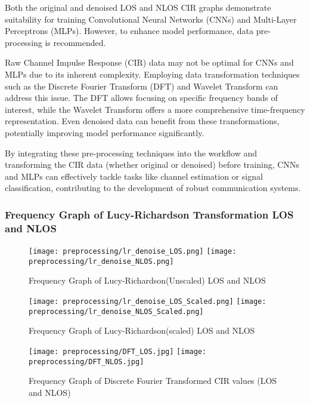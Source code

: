 Both the original and denoised LOS and NLOS CIR graphs demonstrate suitability for training Convolutional Neural Networks (CNNs) and Multi-Layer Perceptrons (MLPs). However, to enhance model performance, data pre-processing is recommended. 

Raw Channel Impulse Response (CIR) data may not be optimal for CNNs and MLPs due to its inherent complexity. Employing data transformation techniques such as the Discrete Fourier Transform (DFT) and Wavelet Transform can address this issue. The DFT allows focusing on specific frequency bands of interest, while the Wavelet Transform offers a more comprehensive time-frequency representation. Even denoised data can benefit from these transformations, potentially improving model performance significantly.

By integrating these pre-processing techniques into the workflow and transforming the CIR data (whether original or denoised) before training, CNNs and MLPs can effectively tackle tasks like channel estimation or signal classification, contributing to the development of robust communication systems.

\subsubsection{Frequency Graph of Lucy-Richardson Transformation LOS and NLOS}\label{frequency_graph_lr}

\begin{figure}[H] 
  \centering
  \texttt{[image: preprocessing/lr\_denoise\_LOS.png]}
  \texttt{[image: preprocessing/lr\_denoise\_NLOS.png]}
  \caption{Frequency Graph of Lucy-Richardson(Unscaled) LOS and NLOS}\label{fig:frequency_graph_lr}
\end{figure}

\begin{figure}[H] 
  \centering
  \texttt{[image: preprocessing/lr\_denoise\_LOS\_Scaled.png]}
  \texttt{[image: preprocessing/lr\_denoise\_NLOS\_Scaled.png]}
  \caption{Frequency Graph of Lucy-Richardson(scaled) LOS and NLOS}\label{fig:frequency_graph_lr_scaled}
\end{figure}

\begin{figure}[H] 
  \centering
  \texttt{[image: preprocessing/DFT\_LOS.jpg]}
  \texttt{[image: preprocessing/DFT\_NLOS.jpg]}
  \caption{Frequency Graph of Discrete Fourier Transformed CIR values (LOS and NLOS)}\label{fig:frequency_graph_dft}
\end{figure}

